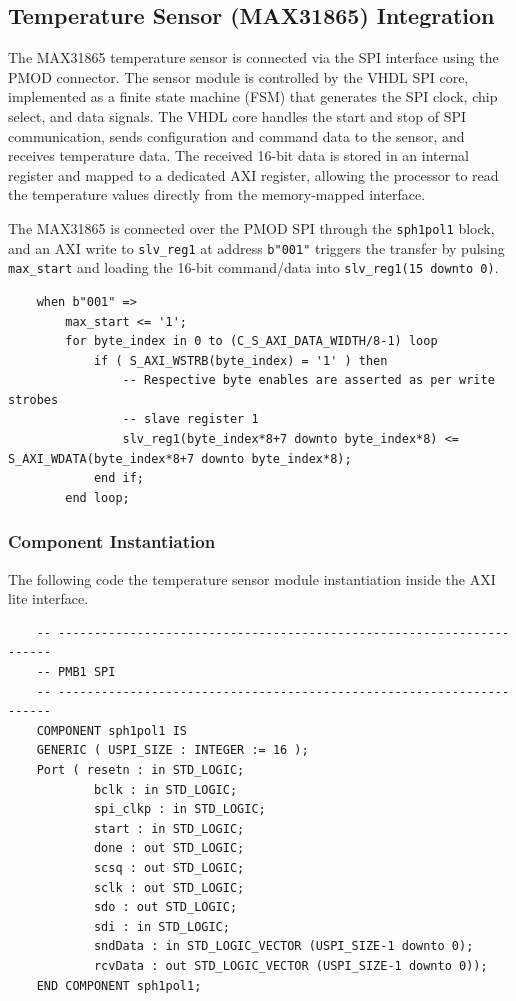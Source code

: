 \subsection{Temperature Sensor (MAX31865) Integration}

The MAX31865 temperature sensor is connected via the SPI interface using the PMOD connector. The sensor module is controlled by the VHDL SPI core, implemented as a finite state machine (FSM) that generates the SPI clock, chip select, and data signals. The VHDL core handles the start and stop of SPI communication, sends configuration and command data to the sensor, and receives temperature data. The received 16-bit data is stored in an internal register and mapped to a dedicated AXI register, allowing the processor to read the temperature values directly from the memory-mapped interface.

The MAX31865 is connected over the PMOD SPI through the \texttt{sph1pol1} block, and an AXI write to \texttt{slv\_reg1} at address \texttt{b"001"} triggers the transfer by pulsing \texttt{max\_start} and loading the 16-bit command/data into \texttt{slv\_reg1(15 downto 0)}.

\begin{verbatim}
	when b"001" =>
	    max_start <= '1';
	    for byte_index in 0 to (C_S_AXI_DATA_WIDTH/8-1) loop
	        if ( S_AXI_WSTRB(byte_index) = '1' ) then
	            -- Respective byte enables are asserted as per write strobes                   
	            -- slave register 1
	            slv_reg1(byte_index*8+7 downto byte_index*8) <= S_AXI_WDATA(byte_index*8+7 downto byte_index*8);
	        end if;
	    end loop;
\end{verbatim}

\subsubsection{Component Instantiation}
The following code the temperature sensor module instantiation inside the AXI lite interface. 

\begin{verbatim}
    -- ---------------------------------------------------------------------
    -- PMB1 SPI
    -- ---------------------------------------------------------------------
    COMPONENT sph1pol1 IS
    GENERIC ( USPI_SIZE : INTEGER := 16 );
    Port ( resetn : in STD_LOGIC;
            bclk : in STD_LOGIC;
            spi_clkp : in STD_LOGIC;
            start : in STD_LOGIC;
            done : out STD_LOGIC;
            scsq : out STD_LOGIC;
            sclk : out STD_LOGIC;
            sdo : out STD_LOGIC;
            sdi : in STD_LOGIC;
            sndData : in STD_LOGIC_VECTOR (USPI_SIZE-1 downto 0);
            rcvData : out STD_LOGIC_VECTOR (USPI_SIZE-1 downto 0));
    END COMPONENT sph1pol1;
\end{verbatim}

